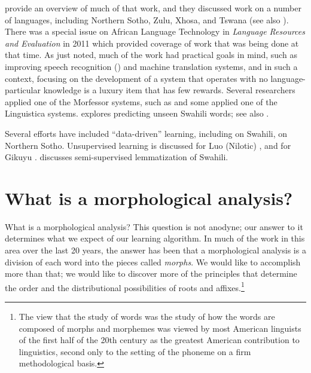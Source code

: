 \documentclass[output=paper,colorlinks,citecolor=brown,
]{langscibook}
\begin{document}
 \cite{DePaude2008improving} provide an overview of much of that work, and they discussed work on a number of languages, including Northern Sotho, Zulu, Xhosa, and Tswana (see also \cite{DePauwEtAl2009}). There was a special issue on African Language Technology in \textit{Language Resources and Evaluation} in 2011 which provided coverage of work that was being done at that time.  As just noted, much of the work had practical goals in mind, such as improving speech recognition (\cite{GelasEtAl2012}) and machine translation systems, and in such a context, focusing on the development of a system that operates with no language-particular knowledge is a luxury item that has few rewards. Several researchers applied one of the Morfessor systems, such as \citet{GelasEtAl2012} and some applied one of the Linguistica systems.  \cite{Linden2008} explores predicting unseen Swahili words; see also \cite{Muhirwe2007}.

 


Several efforts have included ``data-driven'' learning, including  \cite{DePauwEtAl2006} on Swahili, \cite{DeSchryverDePauw2007} on  Northern Sotho. Unsupervised learning is discussed for  Luo (Nilotic) \cite{de2007unsupervised},  and for Gikuyu \cite{DePauwWagacha2007}. \cite{Linden2008} discusses semi-supervised lemmatization of Swahili.
   

\section{What is a morphological analysis?}

What is a morphological analysis? This question is not anodyne; our answer to it determines what we expect of our learning algorithm. In much of the work in this area over the last 20 years, the answer has been that a morphological analysis is a division of each word into the pieces called \textit{morphs}. We would like to accomplish more than that; we would like to discover more of the principles that determine the order and the distributional possibilities of roots and affixes.\footnote{The view that the study of words was the study of how the words are composed of morphs and morphemes was viewed by most American linguists of the first half of the 20th century as the greatest American contribution to linguistics, second only to the setting of the phoneme on a firm methodological basis.}  
\end{document}
